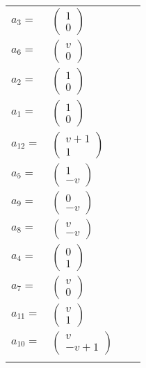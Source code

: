\documentclass[1p]{elsarticle_modified}
\theoremstyle{definition}
\begin{document}
\begin{tabular}{m{7pt} m{180pt} m{7pt} m{180pt} }
\flushright $a_{3}=$&$\begin{pmatrix}1\\0\end{pmatrix}$ \\
\flushright $a_{6}=$&$\begin{pmatrix}v\\0\end{pmatrix}$ \\
\flushright $a_{2}=$&$\begin{pmatrix}1\\0\end{pmatrix}$ \\
\flushright $a_{1}=$&$\begin{pmatrix}1\\0\end{pmatrix}$ \\
\flushright $a_{12}=$&$\begin{pmatrix}v+1\\1\end{pmatrix}$ \\
\flushright $a_{5}=$&$\begin{pmatrix}1\\- v\end{pmatrix}$ \\
\flushright $a_{9}=$&$\begin{pmatrix}0\\- v\end{pmatrix}$ \\
\flushright $a_{8}=$&$\begin{pmatrix}v\\- v\end{pmatrix}$ \\
\flushright $a_{4}=$&$\begin{pmatrix}0\\1\end{pmatrix}$ \\
\flushright $a_{7}=$&$\begin{pmatrix}v\\0\end{pmatrix}$ \\
\flushright $a_{11}=$&$\begin{pmatrix}v\\1\end{pmatrix}$ \\
\flushright $a_{10}=$&$\begin{pmatrix}v\\- v+1\end{pmatrix}$\\&\end{tabular}
\end{document}
